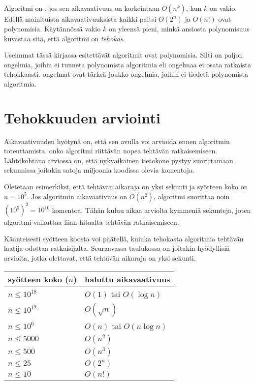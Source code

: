 Algoritmi on ,
jos sen aikavaativuus on korkeintaan $O(n^k)$,
kun $k$ on vakio.
Edellä mainituista aikavaativuuksista
kaikki paitsi $O(2^n)$ ja $O(n!)$
ovat polynomisia.
Käytännössä vakio $k$ on yleensä pieni,
minkä ansiosta
polynomisuus kuvastaa sitä,
että algoritmi on \emph{tehokas}.

Useimmat tässä kirjassa esitettävät algoritmit
ovat polynomisia.
Silti on paljon ongelmia, joihin ei tunneta
polynomista algoritmia eli ongelmaa ei osata
ratkaista tehokkaasti.
 ongelmat ovat
tärkeä joukko ongelmia,
joihin ei tiedetä polynomista algoritmia.

\section{Tehokkuuden arviointi}

Aikavaativuuden hyötynä on,
että sen avulla voi arvioida ennen algoritmin
toteuttamista, onko algoritmi riittävän nopea
tehtävän ratkaisemiseen.
Lähtökohtana arviossa on, että nykyaikainen tietokone
pystyy suorittamaan sekunnissa joitakin
satoja miljoonia koodissa olevia komentoja.

Oletetaan esimerkiksi, että tehtävän aikaraja on 
yksi sekunti ja syötteen koko on $n=10^5$.
Jos algoritmin aikavaativuus on $O(n^2)$,
algoritmi suorittaa noin $(10^5)^2=10^{10}$ komentoa.
Tähän kuluu aikaa arviolta kymmeniä sekunteja,
joten algoritmi vaikuttaa liian hitaalta tehtävän ratkaisemiseen.

Käänteisesti syötteen koosta voi päätellä,
kuinka tehokasta algoritmia tehtävän laatija odottaa
ratkaisijalta.
Seuraavassa taulukossa on joitakin hyödyllisiä arvioita,
jotka olettavat, että tehtävän aikaraja on yksi sekunti.

\begin{center}
\begin{tabular}{ll}
syötteen koko ($n$) & haluttu aikavaativuus \\
\hline
$n \le 10^{18}$ & $O(1)$ tai $O(\log n)$ \\
$n \le 10^{12}$ & $O(\sqrt n)$ \\
$n \le 10^6$ & $O(n)$ tai $O(n \log n)$ \\
$n \le 5000$ & $O(n^2)$ \\
$n \le 500$ & $O(n^3)$ \\
$n \le 25$ & $O(2^n)$ \\
$n \le 10$ & $O(n!)$ \\
\end{tabular}
\end{center}

